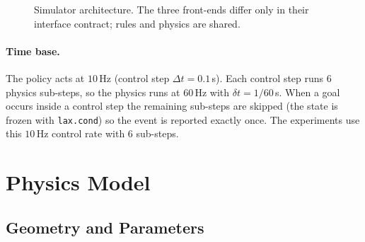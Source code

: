 \begin{figure}[ht]
    \centering
    \caption{Simulator architecture.  The three front-ends differ only in their
    interface contract; rules and physics are shared.}
    \label{fig:sim_arch}
\end{figure}

\paragraph{Time base.}
The policy acts at $10$\,Hz (control step $\Delta t = 0.1$\,s).  Each control
step runs $6$ physics sub-steps, so the physics runs at $60$\,Hz with
$\delta t = 1/60$\,s.  When a goal occurs inside a control step the remaining
sub-steps are skipped (the state is frozen with \texttt{lax.cond}) so the event
is reported exactly once.  The experiments use this $10$\,Hz control rate with $6$ sub-steps.

\section{Physics Model}
\label{sec:sim_physics}

\subsection{Geometry and Parameters}


